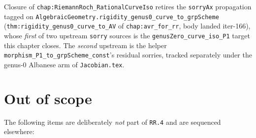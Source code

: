 \begin{remark}
  \label{rmk:rr4_unblocks_sorryAx_on_rigidity_genus0}
  Closure of \texttt{chap:RiemannRoch_RationalCurveIso} retires the
  \texttt{sorryAx} propagation tagged on
  \texttt{AlgebraicGeometry.rigidity\_genus0\_curve\_to\_grpScheme}
  (\texttt{thm:rigidity_genus0_curve_to_AV} of
  \texttt{chap:avr_for_rr}, body landed iter-166), whose
  \emph{first} of two upstream \texttt{sorry} sources is the
  \texttt{genusZero\_curve\_iso\_P1} target this chapter closes. The
  \emph{second} upstream is the helper
  \texttt{morphism\_P1\_to\_grpScheme\_const}'s residual sorries, tracked
  separately under the genus-\(0\) Albanese arm of \texttt{Jacobian.tex}.
\end{remark}
\section{Out of scope}
The following items are deliberately \emph{not} part of \texttt{RR.4} and
are sequenced elsewhere:
